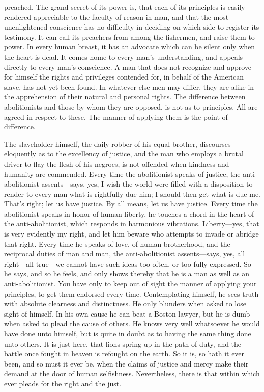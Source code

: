 preached. The grand secret of its power is, that each of its principles
is easily rendered appreciable to the faculty of reason in man, and that
the most unenlightened conscience has no difficulty in deciding on which
side to register its testimony. It can call its preachers from among the
fishermen, and raise them to power. In every human breast, it has an
advocate which can be silent only when the heart is dead. It comes home
to every man's understanding, and appeals directly to every man's
conscience. A man that does not recognize and approve for himself the
rights and privileges contended for, in behalf of the American slave,
has not yet been found. In whatever else men may differ, they are alike
in the apprehension of their natural and personal rights. The difference
between abolitionists and those by whom they are opposed, is not as to
principles. All are agreed in respect to these. The manner of applying
them is the point of difference.

The slaveholder himself, the daily robber of his equal brother,
discourses eloquently as to the excellency of justice, and the man who
employs a brutal driver to flay the flesh of his negroes, is not
offended when kindness and humanity are commended. Every time the
abolitionist speaks of justice, the anti-abolitionist assents---says,
yes, I wish the world were filled with a disposition to render to every
man what is rightfully due him; I should then get what is due me. That's
right; let us have justice. By all means, let us have justice. Every
time the abolitionist speaks in honor of human liberty, he touches a
chord in the heart of the anti-abolitionist, which responds in
harmonious vibrations. Liberty---yes, {}that is very evidently my right,
and let him beware who attempts to invade or abridge that right. Every
time he speaks of love, of human brotherhood, and the reciprocal duties
of man and man, the anti-abolitionist assents---says, yes, all
right---all true---we cannot have such ideas too often, or too fully
expressed. So he says, and so he feels, and only shows thereby that he
is a man as well as an anti-abolitionist. You have only to keep out of
sight the manner of applying your principles, to get them endorsed every
time. Contemplating himself, he sees truth with absolute clearness and
distinctness. He only blunders when asked to lose sight of himself. In
his own cause he can beat a Boston lawyer, but he is dumb when asked to
plead the cause of others. He knows very well whatsoever he would have
done unto himself, but is quite in doubt as to having the same thing
done unto others. It is just here, that lions spring up in the path of
duty, and the battle once fought in heaven is refought on the earth. So
it is, so hath it ever been, and so must it ever be, when the claims of
justice and mercy make their demand at the door of human selfishness.
Nevertheless, there is that within which ever pleads for the right and
the just.

